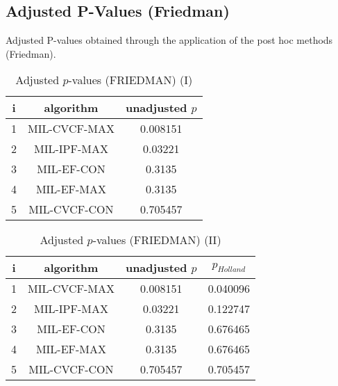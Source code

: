 \documentclass[a4paper,10pt]{article}
\begin{document}
\begin{landscape}
\newpage

\section{Adjusted P-Values (Friedman)}


Adjusted P-values obtained through the application of the post hoc methods (Friedman).

\begin{table}[!htp]
\centering\small
\begin{tabular}{ccc}
i&algorithm&unadjusted $p$\\
\hline1&MIL-CVCF-MAX&0.008151\\2&MIL-IPF-MAX&0.03221\\3&MIL-EF-CON&0.3135\\4&MIL-EF-MAX&0.3135\\5&MIL-CVCF-CON&0.705457\\\hline
\end{tabular}
\caption{Adjusted $p$-values (FRIEDMAN) (I)}
\end{table}
\begin{table}[!htp]
\centering\small
\begin{tabular}{cccc}
i&algorithm&unadjusted $p$&$p_{Holland}$\\
\hline1&MIL-CVCF-MAX&0.008151&0.040096\\2&MIL-IPF-MAX&0.03221&0.122747\\3&MIL-EF-CON&0.3135&0.676465\\4&MIL-EF-MAX&0.3135&0.676465\\5&MIL-CVCF-CON&0.705457&0.705457\\\hline
\end{tabular}
\caption{Adjusted $p$-values (FRIEDMAN) (II)}
\end{table}

\newpage
\end{landscape}
\end{document}
